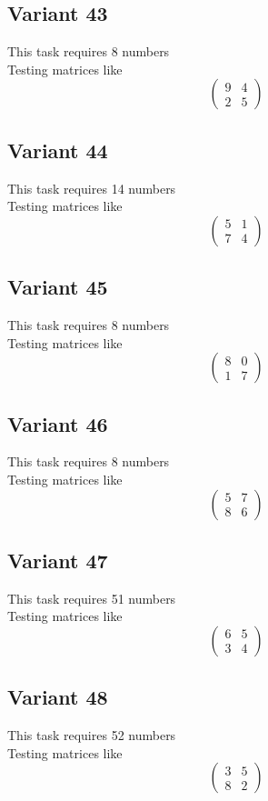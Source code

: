\documentclass[11pt]{article}
\begin{document}
\subsection*{Variant 43}
This task requires 8 numbers\\
Testing matrices like \[ \begin{pmatrix} 9 & 4\\ 2 & 5 \end{pmatrix} \]

\subsection*{Variant 44}
This task requires 14 numbers\\
Testing matrices like \[ \begin{pmatrix} 5 & 1\\ 7 & 4 \end{pmatrix} \]

\subsection*{Variant 45}
This task requires 8 numbers\\
Testing matrices like \[ \begin{pmatrix} 8 & 0\\ 1 & 7 \end{pmatrix} \]

\subsection*{Variant 46}
This task requires 8 numbers\\
Testing matrices like \[ \begin{pmatrix} 5 & 7\\ 8 & 6 \end{pmatrix} \]

\subsection*{Variant 47}
This task requires 51 numbers\\
Testing matrices like \[ \begin{pmatrix} 6 & 5\\ 3 & 4 \end{pmatrix} \]

\subsection*{Variant 48}
This task requires 52 numbers\\
Testing matrices like \[ \begin{pmatrix} 3 & 5\\ 8 & 2 \end{pmatrix} \]
\end{document}
